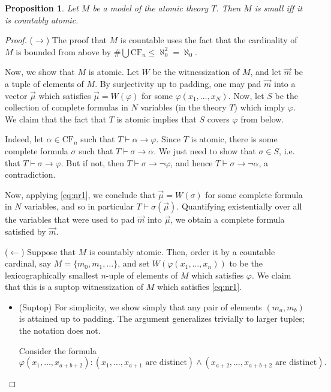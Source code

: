 \documentclass{article}
\newtheorem{prop}[theorem]{Proposition}
\theoremstyle{nonumberplain}
\newtheorem{proof}{Proof}
\newcommand{\CF}{\mathrm{CF}}
\begin{document}
\begin{prop}\label{prop:mainresult0}
Let $M$ be a model of the atomic theory $T$. Then $M$ is small iff it is countably atomic.
\end{prop}

\begin{proof}
($\rightarrow$) The proof that $M$ is countable uses the fact that the cardinality of $M$ is bounded from above by $\# \bigcup \CF_n \leq \aleph_0^2 = \aleph_0$.

Now, we show that $M$ is atomic. Let $W$ be the witnessization of $M$, and let $\vec m$ be a tuple of elements of $M$. By surjectivity up to padding, one may pad $\vec m$ into a vector $\vec \mu$ which satisfies $\vec \mu = W(\varphi)$ for some $\varphi(x_1, \dots, x_N)$. Now, let $S$ be the collection of complete formulas in $N$ variables (in the theory $T$) which imply $\varphi$. We claim that the fact that $T$ is atomic implies that $S$ covers $\varphi$ from below.

Indeed, let $\alpha \in \CF_n$ such that $T \vdash \alpha \rightarrow \varphi$. Since $T$ is atomic, there is some complete formula $\sigma$ such that $T \vdash \sigma \rightarrow \alpha$. We just need to show that $\sigma \in S$, i.e. that $T \vdash \sigma \rightarrow \varphi$. But if not, then $T \vdash \sigma \rightarrow \neg \varphi$, and hence $T \vdash \sigma \rightarrow \neg \alpha$, a contradiction.

Now, applying \eqref{eq:nr1}, we conclude that $\vec\mu = W(\sigma)$ for some complete formula in $N$ variables, and so in particular $T \vdash \sigma(\vec\mu)$. Quantifying existentially over all the variables that were used to pad $\vec m$ into $\vec \mu$, we obtain a complete formula satisfied by $\vec m$.

\medskip

($\leftarrow$) Suppose that $M$ is countably atomic. Then, order it by a countable cardinal, say $M = \{m_0, m_1, \dots\}$, and set $W(\varphi(x_1, \dots, x_n))$ to be the lexicographically smallest $n$-uple of elements of $M$ which satisfies $\varphi$. We claim that this is a suptop witnessization of $M$ which satisfies \eqref{eq:nr1}.
\begin{itemize}
\item (Suptop) For simplicity, we show simply that any pair of elements $(m_a, m_b)$ is attained up	to padding. The argument generalizes trivially to larger tuples; the notation does not.

Consider the formula
\begin{equation}
\varphi(x_1, \dots, x_{a+b+2}) \colon (\text{$x_1, \dots, x_{a+1}$ are distinct}) \land (\text{$x_{a+2}, \dots, x_{a+b+2}$ are distinct}).
\end{equation}


\end{itemize}
\end{proof}
\end{document}
